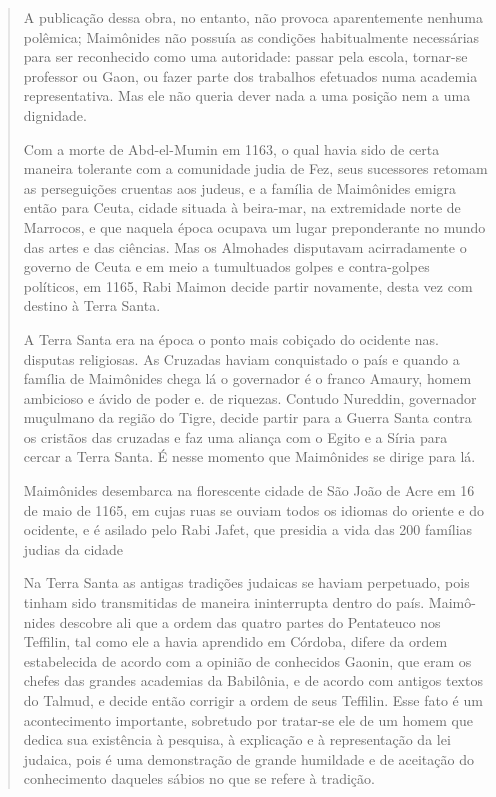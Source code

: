 \begin{quote}
A publicação dessa obra, no entanto, não provoca aparentemente nenhuma
polêmica; Maimônides não possuía as condições habitualmente ne­cessárias
para ser reconhecido como uma autoridade: passar pela escola, tornar-se
professor ou Gaon, ou fazer parte dos trabalhos efetuados numa academia
re­presentativa. Mas ele não queria dever nada a uma posição nem a uma
dignidade.

Com a morte de Abd-el-Mumin em 1163, o qual havia sido de certa maneira
tolerante com a comunidade judia de Fez, seus sucessores retomam as
perseguições cruentas aos judeus, e a família de Maimônides emigra então
para Ceuta, cidade situada à beira-mar, na extremidade norte de
Marrocos, e que naquela época ocupava um lugar preponderante no mundo
das artes e das ciências. Mas os Almohades disputavam acirradamente o
governo de Ceuta e em meio a tumultuados golpes e contra-golpes
políticos, em 1165, Rabi Mai­mon decide partir novamente, desta vez com
destino à Terra Santa.

A Terra Santa era na época o ponto mais cobiçado do ocidente nas.
disputas religiosas. As Cruzadas haviam conquistado o país e quando a
família de Maimônides chega lá o governador é o franco Amaury, homem
ambicioso e ávido de poder e. de riquezas. Contudo Nureddin, governador
muçulmano da região do Tigre, decide partir para a Guerra Santa contra
os cristãos das cru­zadas e faz uma aliança com o Egito e a Síria para
cercar a Terra Santa. É nesse momento que Maimônides se dirige para lá.

Maimônides desembarca na florescente cidade de São João de Acre em 16 de
maio de 1165, em cujas ruas se ouviam todos os idiomas do oriente e do
ocidente, e é asilado pelo Rabi Jafet, que presidia a vida das 200
famílias judias da cidade

Na Terra Santa as antigas tradições judaicas se haviam perpetuado, pois
tinham sido transmitidas de maneira ininterrupta dentro do país. Maimô-
nides descobre ali que a ordem das quatro partes do Pentateuco nos
Teffilin, tal como ele a havia aprendido em Córdoba, difere da ordem
estabelecida de acordo com a opinião de conhecidos Gaonin, que eram os
chefes das grandes academias da Babilônia, e de acordo com antigos
textos do Talmud, e decide então corrigir a ordem de seus Teffilin. Esse
fato é um acontecimento impor­tante, sobretudo por tratar-se ele de um
homem que dedica sua existência à pesquisa, à explicação e à
representação da lei judaica, pois é uma demonstra­ção de grande
humildade e de aceitação do conhecimento daqueles sábios no que se
refere à tradição.


\end{quote}
